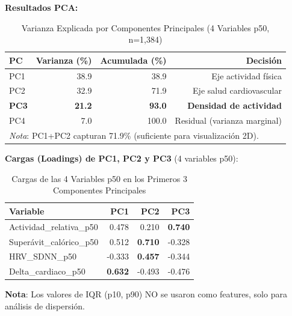 \documentclass[12pt,letterpaper,twoside]{report}
\begin{document}
\begin{calculobox}
\textbf{Resultados PCA:}

\begin{table}[H]
\centering
\caption{Varianza Explicada por Componentes Principales (4 Variables p50, n=1,384)}
\label{tab:pca_variance}
\begin{tabular}{@{}lrrr@{}}
\toprule
\textbf{PC} & \textbf{Varianza (\%)} & \textbf{Acumulada (\%)} & \textbf{Decisión} \\
\midrule
PC1 & 38.9 & 38.9 & Eje actividad física \\
PC2 & 32.9 & 71.9 & Eje salud cardiovascular \\
\textbf{PC3} & \textbf{21.2} & \textbf{93.0} & \textbf{Densidad de actividad} \\
PC4 & 7.0  & 100.0 & Residual (varianza marginal) \\
\bottomrule
\multicolumn{4}{l}{\footnotesize \textit{Nota}: PC1+PC2 capturan 71.9\% (suficiente para visualización 2D).}
\end{tabular}
\end{table}

\textbf{Cargas (Loadings) de PC1, PC2 y PC3} (4 variables p50):

\begin{table}[H]
\centering
\begin{tabular}{@{}lrrr@{}}
\toprule
\textbf{Variable} & \textbf{PC1} & \textbf{PC2} & \textbf{PC3} \\
\midrule
Actividad\_relativa\_p50     & 0.478 & 0.210 & \textbf{0.740} \\
Superávit\_calórico\_p50     & 0.512 & \textbf{0.710} & -0.328 \\
HRV\_SDNN\_p50               & -0.333 & \textbf{0.457} & -0.344 \\
Delta\_cardiaco\_p50         & \textbf{0.632} & -0.493 & -0.476 \\
\bottomrule
\end{tabular}
\caption{Cargas de las 4 Variables p50 en los Primeros 3 Componentes Principales}
\label{tab:pca_loadings}
\end{table}

\textbf{Nota}: Los valores de IQR (p10, p90) NO se usaron como features, solo para análisis de dispersión.
\end{calculobox}
\end{document}
